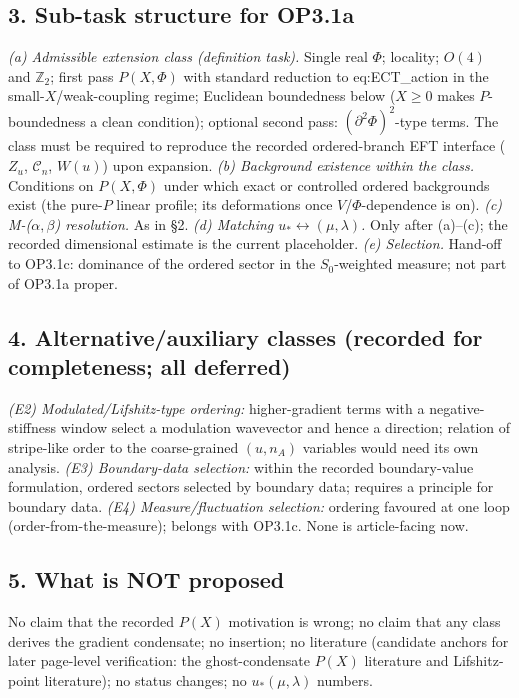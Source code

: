 \subsection*{3. Sub-task structure for OP3.1a}
\emph{(a) Admissible extension class (definition task).}
Single real $\Phi$; locality; $O(4)$ and $\mathbb Z_2$;
first pass $P(X,\Phi)$ with standard reduction to
eq:ECT\_action in the small-$X$/weak-coupling regime;
Euclidean boundedness below ($X\ge0$ makes $P$-boundedness a clean
condition); optional second pass: $(\partial^2\Phi)^2$-type terms.
The class must be required to reproduce the recorded
ordered-branch EFT interface ($Z_u$, $\mathcal C_n$, $W(u)$) upon
expansion.
\emph{(b) Background existence within the class.}
Conditions on $P(X,\Phi)$ under which exact or controlled
ordered backgrounds exist (the pure-$P$ linear profile; its
deformations once $V$/$\Phi$-dependence is on).
\emph{(c) M-($\alpha,\beta$) resolution.}
As in \S2.
\emph{(d) Matching $u_*\leftrightarrow(\mu,\lambda)$.}
Only after (a)--(c); the recorded dimensional estimate is the
current placeholder.
\emph{(e) Selection.}
Hand-off to OP3.1c: dominance of the ordered sector in the
$S_0$-weighted measure; not part of OP3.1a proper.

\subsection*{4. Alternative/auxiliary classes (recorded for
completeness; all deferred)}
\emph{(E2) Modulated/Lifshitz-type ordering:} higher-gradient
terms with a negative-stiffness window select a modulation
wavevector and hence a direction; relation of stripe-like order to
the coarse-grained $(u,n_A)$ variables would need its own
analysis.
\emph{(E3) Boundary-data selection:} within the recorded
boundary-value formulation, ordered sectors selected by boundary
data; requires a principle for boundary data.
\emph{(E4) Measure/fluctuation selection:} ordering favoured at
one loop (order-from-the-measure); belongs with OP3.1c.
None is article-facing now.

\subsection*{5. What is NOT proposed}
No claim that the recorded $P(X)$ motivation is wrong; no claim
that any class derives the gradient condensate; no insertion; no
literature (candidate anchors for later page-level verification:
the ghost-condensate $P(X)$ literature and Lifshitz-point
literature); no status changes; no $u_*(\mu,\lambda)$ numbers.

